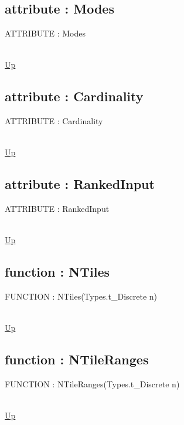 \subsection*{attribute : Modes}
\hypertarget{ecldoc:ml_core.fieldaggregates.modes}{ATTRIBUTE : Modes} \\
\hyperlink{ecldoc:ml_core.fieldaggregates}{Up} \\
\par
\subsection*{attribute : Cardinality}
\hypertarget{ecldoc:ml_core.fieldaggregates.cardinality}{ATTRIBUTE : Cardinality} \\
\hyperlink{ecldoc:ml_core.fieldaggregates}{Up} \\
\par
\subsection*{attribute : RankedInput}
\hypertarget{ecldoc:ml_core.fieldaggregates.rankedinput}{ATTRIBUTE : RankedInput} \\
\hyperlink{ecldoc:ml_core.fieldaggregates}{Up} \\
\par
\subsection*{function : NTiles}
\hypertarget{ecldoc:ml_core.fieldaggregates.ntiles}{FUNCTION : NTiles(Types.t\_Discrete n)} \\
\hyperlink{ecldoc:ml_core.fieldaggregates}{Up} \\
\par
\subsection*{function : NTileRanges}
\hypertarget{ecldoc:ml_core.fieldaggregates.ntileranges}{FUNCTION : NTileRanges(Types.t\_Discrete n)} \\
\hyperlink{ecldoc:ml_core.fieldaggregates}{Up} \\
\par

